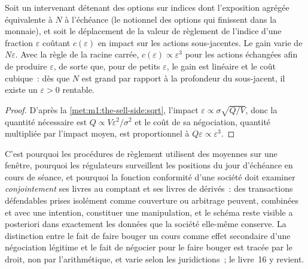 \begin{proposition}\label{prop:m1:options-markets-europe-asia:leverage}
Soit un intervenant détenant des options sur indices dont l'exposition agrégée équivalente à 
$N$ à l'échéance (le notionnel des options qui finissent dans la
monnaie), et soit le déplacement de la valeur de règlement de l'indice d'une fraction
$\varepsilon$ coûtant $c(\varepsilon)$ en impact sur les actions sous-jacentes. Le
gain varie de $N\varepsilon$. Avec la règle de la racine carrée,
$c(\varepsilon) \propto \varepsilon^{3}$ pour les actions échangées afin de produire
$\varepsilon$, de sorte que, pour de petits $\varepsilon$, le gain est linéaire et le coût
cubique~: dès que $N$ est grand par rapport à la profondeur du sous-jacent, il existe
un $\varepsilon > 0$ rentable.
\end{proposition}
\begin{proof}
D'après la \cref{met:m1:the-sell-side:sqrt}, l'impact $\varepsilon \propto
\sigma\sqrt{Q/V}$, donc la quantité nécessaire est $Q \propto V\varepsilon^2/\sigma^2$
et le coût de sa négociation, quantité multipliée par l'impact moyen, est proportionnel à
$Q\varepsilon \propto \varepsilon^3$.
\end{proof}

C'est pourquoi les procédures de règlement utilisent des moyennes sur une fenêtre, pourquoi les régulateurs
surveillent les positions du jour d'échéance en cours de séance, et pourquoi la fonction conformité d'une société
doit examiner \emph{conjointement} ses livres au comptant et ses livres de dérivés~: des transactions
défendables prises isolément comme couverture ou arbitrage peuvent, combinées et avec une intention,
constituer une manipulation, et le schéma reste visible a posteriori dans exactement les
données que la société elle-même conserve. La distinction entre le fait de faire bouger un cours
comme effet secondaire d'une négociation légitime et le fait de négocier pour le faire bouger est tracée
par le droit, non par l'arithmétique, et varie selon les juridictions~; le livre~16
y revient.

